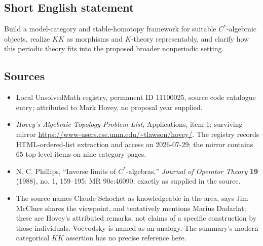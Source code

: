 \documentclass[11pt]{article}
\begin{document}
\subsection{Short English statement}
Build a model-category and stable-homotopy framework for suitable $C^*$-algebraic objects, realize $KK$ as morphisms and $K$-theory representably, and clarify how this periodic theory fits into the proposed broader nonperiodic setting.
\subsection{Sources}
\begin{itemize}
\item Local UnsolvedMath registry, permanent ID 11100025, source code catalogue entry; attributed to Mark Hovey, no proposal year supplied.
\item \emph{Hovey's Algebraic Topology Problem List}, Applications, item 1; surviving mirror \url{https://www-users.cse.umn.edu/~tlawson/hovey/}. The registry records HTML-ordered-list extraction and access on 2026-07-29; the mirror contains 65 top-level items on nine category pages.
\item N. C. Phillips, ``Inverse limits of $C^*$-algebras,'' \emph{Journal of Operator Theory} \textbf{19} (1988), no. 1, 159--195; MR 90c:46090, exactly as supplied in the source.
\item The source names Claude Schochet as knowledgeable in the area, says Jim McClure shares the viewpoint, and tentatively mentions Marius Dadarlat; these are Hovey's attributed remarks, not claims of a specific construction by those individuals. Voevodsky is named as an analogy. The summary's modern categorical $KK$ assertion has no precise reference here.
\end{itemize}
\end{document}
